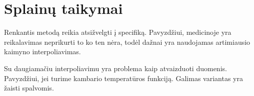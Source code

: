 

\section{Splainų taikymai}


Renkantis metodą reikia atsižvelgti į specifiką. Pavyzdžiui, medicinoje
yra reikalavimas neprikurti to ko ten nėra, todėl dažnai yra naudojamas
artimiausio kaimyno interpoliavimas.


Su daugiamačiu interpoliavimu yra problema kaip atvaizduoti duomenis.
Pavyzdžiui, jei turime kambario temperatūros funkciją. Galimas
variantas yra žaisti spalvomis.



